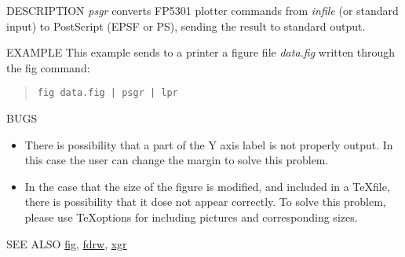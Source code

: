 \begin{synopsis}
 \item[psgr] [ --t {\em title} ] [ --s $S$ ] [ --c $C$ ] [ --x $X$ ]
[ --y $Y$ ] [ --p P ] [ --r $R$ ] [ --b ] 
\item[\ ~~~~~][ --T $T$ ] [ --B $B$ ]
[ --L $L$ ] [ --R $R$ ] [ --P ] [ {\em infile} ]
\end{synopsis}

\begin{qsection}{DESCRIPTION}
{\em psgr} converts FP5301 plotter commands 
from {\em infile} (or standard input) to PostScript (EPSF or PS), 
sending the result to standard output.
\end{qsection}

\begin{options}
\end{options}

\begin{qsection}{EXAMPLE}
This example sends to a printer a figure file {\em data.fig}
written through the fig command:
\begin{quote}
 \verb!fig data.fig | psgr | lpr!
\end{quote}
\end{qsection}

\begin{qsection}{BUGS}
\begin{itemize}
\item There is possibility that a part of the Y axis label
is not properly output. In this case the user can 
change the margin to solve this problem.

\item In the case that the size of the figure is modified,
and included in a \TeX file, there is possibility that
it dose not appear correctly.
To solve this problem, please use \TeX options for including 
pictures and corresponding sizes.
\end{itemize}
\end{qsection}

\begin{qsection}{SEE ALSO}
\hyperlink{fig}{fig},
\hyperlink{fdrw}{fdrw},
\hyperlink{xgr}{xgr}
\end{qsection}
